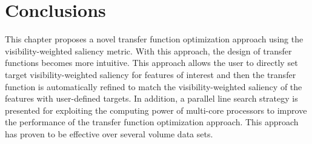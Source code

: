 %
%

\section{Conclusions}
This chapter proposes a novel transfer function optimization approach using the visibility-weighted saliency metric.
With this approach, the design of transfer functions becomes more intuitive. This approach allows the user to directly set target visibility-weighted saliency for features of interest and then the transfer function is automatically refined to match the visibility-weighted saliency of the features with user-defined targets. In addition, a parallel line search strategy is presented for exploiting the computing power of multi-core processors to improve the performance of the transfer function optimization approach.
This approach has proven to be effective over several volume data sets.
